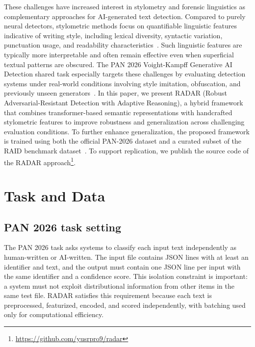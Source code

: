 \documentclass[]{ceurart}
\begin{document}
These challenges have increased interest in stylometry and forensic linguistics as complementary approaches for AI-generated text detection. Compared to purely neural detectors, stylometric methods focus on quantifiable linguistic features indicative of writing style, including lexical diversity, syntactic variation, punctuation usage, and readability characteristics~\cite{juola2006authorship,coulthard2017forensic}. Such linguistic features are typically more interpretable and often remain effective even when superficial textual patterns are obscured. The PAN 2026 Voight-Kampff Generative AI Detection shared task especially targets these challenges by evaluating detection systems under real-world conditions involving style imitation, obfuscation, and previously unseen generators~\cite{bevendorff:2026b,bevendorff:2026c}. In this paper, we present RADAR (Robust Adversarial-Resistant Detection with Adaptive Reasoning), a hybrid framework that combines transformer-based semantic representations with handcrafted stylometric features to improve robustness and generalization across challenging evaluation conditions. To further enhance generalization, the proposed framework is trained using both the official PAN-2026 dataset and a curated subset of the RAID benchmark dataset~\cite{dugan2024raid}.
To support replication, we publish the source code of the RADAR approach\footnote{\url{https://github.com/yusrpro9/radar}}.

\section{Task and Data}

\subsection{PAN 2026 task setting}

The PAN 2026 task asks systems to classify each input text independently as human-written or AI-written. The input file contains JSON lines with at least an identifier and text, and the output must contain one JSON line per input with the same identifier and a confidence score. This isolation constraint is important: a system must not exploit distributional information from other items in the same test file. RADAR satisfies this requirement because each text is preprocessed, featurized, encoded, and scored independently, with batching used only for computational efficiency.
\end{document}

